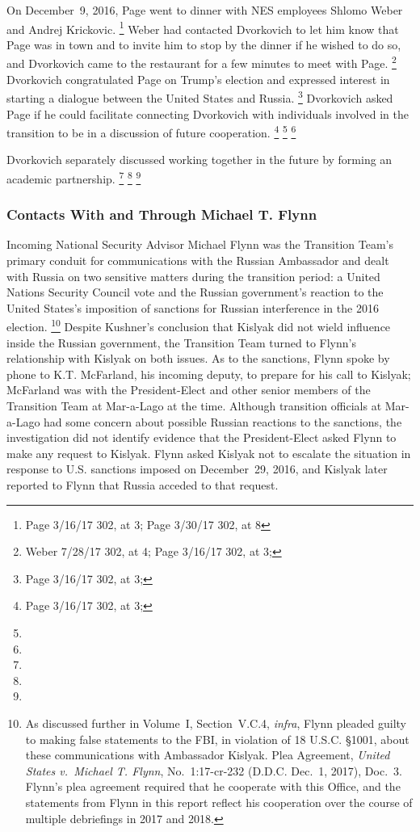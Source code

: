 On December~9, 2016, Page went to dinner with NES employees Shlomo Weber and Andrej Krickovic.%
\footnote{Page 3/16/17 302, at 3;
Page 3/30/17 302, at 8}
Weber had contacted Dvorkovich to let him know that Page was in town and to invite him to stop by the dinner if he wished to do so, and Dvorkovich came to the restaurant for a few minutes to meet with Page.%
\footnote{Weber 7/28/17 302, at 4;
Page 3/16/17 302, at 3;
}
Dvorkovich congratulated Page on Trump's election and expressed interest in starting a dialogue between the United States and Russia.%
\footnote{Page 3/16/17 302, at 3;
}
Dvorkovich asked Page if he could facilitate connecting Dvorkovich with individuals involved in the transition to be in a discussion of future cooperation.%
\footnote{Page 3/16/17 302, at 3;
}
\footnote{}
\footnote{}

Dvorkovich separately discussed working together in the future by forming an academic partnership.%
\footnote{}
\footnote{}
\footnote{}

\subsubsection{Contacts With and Through Michael T. Flynn}

Incoming National Security Advisor Michael Flynn was the Transition Team's primary conduit for communications with the Russian Ambassador and dealt with Russia on two sensitive matters during the transition period: a United Nations Security Council vote and the Russian government's reaction to the United States's imposition of sanctions for Russian interference in the 2016 election.%
\footnote{As discussed further in Volume~I, Section~V.C.4, \textit{infra}, Flynn pleaded guilty to making false statements to the FBI, in violation of 18 U.S.C. \S 1001, about these communications with Ambassador Kislyak.
Plea Agreement, \textit{United States v.\ Michael T. Flynn}, No.~1:17-cr-232 (D.D.C. Dec.~1, 2017), Doc.~3.
Flynn's plea agreement required that he cooperate with this Office, and the statements from Flynn in this report reflect his cooperation over the course of multiple debriefings in 2017 and 2018.}
Despite Kushner's conclusion that Kislyak did not wield influence inside the Russian government, the Transition Team turned to Flynn's relationship with Kislyak on both issues.
As to the sanctions, Flynn spoke by phone to K.T. McFarland, his incoming deputy, to prepare for his call to Kislyak; McFarland was with the President-Elect and other senior members of the Transition Team at Mar-a-Lago at the time.
Although transition officials at Mar-a-Lago had some concern about possible Russian reactions to the sanctions, the investigation did not identify evidence that the President-Elect asked Flynn to make any request to Kislyak.
Flynn asked Kislyak not to escalate the situation in response to U.S. sanctions imposed on December~29, 2016, and Kislyak later reported to Flynn that Russia acceded to that request.

